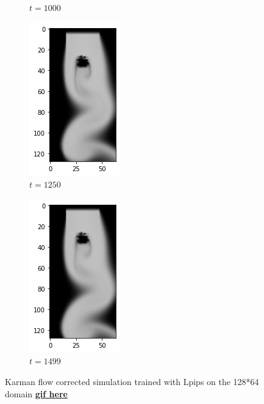 \documentclass[a4paper,12pt,twoside]{report}
\begin{document}
\begin{figure}
\begin{subfigure}{0.18\textwidth}
		\caption{$t=1000$}
	\end{subfigure}
	\begin{subfigure}{0.18\textwidth}
		\centering
		\includegraphics[scale=0.5]{karmanflow/lpips_density_001250.png}
		\caption{$t=1250$}
	\end{subfigure}
	\begin{subfigure}{0.18\textwidth}
		\centering
		\includegraphics[scale=0.5]{karmanflow/lpips_density_001499.png}
		\caption{$t=1499$}
	\end{subfigure}
	\caption{Karman flow corrected simulation trained with Lpips on the 128*64 domain \href{https://github.com/w191444052/sol-data/blob/master/karman_high/lpips.gif}{\bf{gif here}}}
	\label{sol karman high lpips}
\end{figure}
\end{document}
